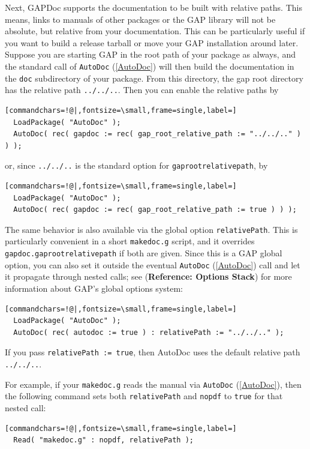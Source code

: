 \documentclass[a4paper,11pt]{report}
\begin{document}
{{{ Next, \textsf{GAPDoc} supports the documentation to be built with relative paths. This means, links
to manuals of other packages or the \textsf{GAP} library will not be absolute, but relative from your documentation. This can
be particularly useful if you want to build a release tarball or move your \textsf{GAP} installation around later. Suppose you are starting \textsf{GAP} in the root path of your package as always, and the standard call of \texttt{AutoDoc} (\ref{AutoDoc}) will then build the documentation in the \texttt{doc} subdirectory of your package. From this directory, the gap root directory has
the relative path \texttt{../../..}. Then you can enable the relative paths by 
\begin{Verbatim}[commandchars=!@|,fontsize=\small,frame=single,label=]
  LoadPackage( "AutoDoc" );
  AutoDoc( rec( gapdoc := rec( gap_root_relative_path := "../../.." ) ) );
\end{Verbatim}
 or, since \texttt{../../..} is the standard option for \texttt{gap{\textunderscore}root{\textunderscore}relative{\textunderscore}path}, by 
\begin{Verbatim}[commandchars=!@|,fontsize=\small,frame=single,label=]
  LoadPackage( "AutoDoc" );
  AutoDoc( rec( gapdoc := rec( gap_root_relative_path := true ) ) );
\end{Verbatim}
 

 The same behavior is also available via the global option \texttt{relativePath}. This is particularly convenient in a short \texttt{makedoc.g} script, and it overrides \texttt{gapdoc.gap{\textunderscore}root{\textunderscore}relative{\textunderscore}path} if both are given. Since this is a GAP global option, you can also set it
outside the eventual \texttt{AutoDoc} (\ref{AutoDoc}) call and let it propagate through nested calls; see  (\textbf{Reference: Options Stack}) for more information about GAP's global options system: 
\begin{Verbatim}[commandchars=!@|,fontsize=\small,frame=single,label=]
  LoadPackage( "AutoDoc" );
  AutoDoc( rec( autodoc := true ) : relativePath := "../../.." );
\end{Verbatim}
 If you pass \texttt{relativePath := true}, then \textsf{AutoDoc} uses the default relative path \texttt{../../..}. 

 For example, if your \texttt{makedoc.g} reads the manual via \texttt{AutoDoc} (\ref{AutoDoc}), then the following command sets both \texttt{relativePath} and \texttt{nopdf} to \texttt{true} for that nested call: 
\begin{Verbatim}[commandchars=!@|,fontsize=\small,frame=single,label=]
  Read( "makedoc.g" : nopdf, relativePath );
\end{Verbatim}
 

}}}
\end{document}
